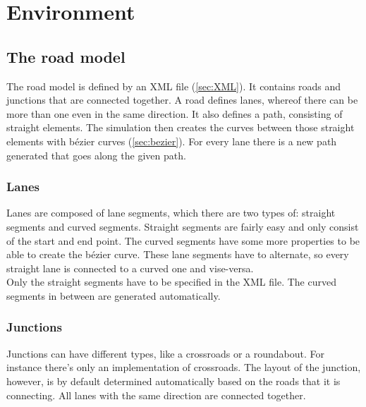 
\section{Environment}
\label{sec:environment}

\subsection{The road model}
\label{sec:roadModel}

The road model is defined by an XML file (\ref{sec:XML}). It contains roads and
junctions that are connected together. A road defines lanes, whereof
there can be more than one even in the same direction. It also defines
a path, consisting of straight elements. The simulation then creates the 
curves between those straight elements with bézier curves (\ref{sec:bezier}).
For every lane there is a new path generated that goes along the given path.


\subsubsection{Lanes}
\label{sec:lanes}

Lanes are composed of lane segments, which there are two types of:
straight segments and curved segments. Straight segments are fairly
easy and only consist of the start and end point. The curved segments
have some more properties to be able to create the bézier curve. 
These lane segments have to alternate, so every straight lane is connected
to a curved one and vise-versa. \\

\noindent Only the straight segments have to be specified in the XML file. 
The curved segments in between are generated automatically.


\subsubsection{Junctions}
\label{sec:junctions}

Junctions can have different types, like a crossroads or a roundabout. 
For instance there's only an implementation of crossroads. 
The layout of the junction, however, is by default 
determined automatically based on the roads that it is connecting. All 
lanes with the same direction are connected together. \\

